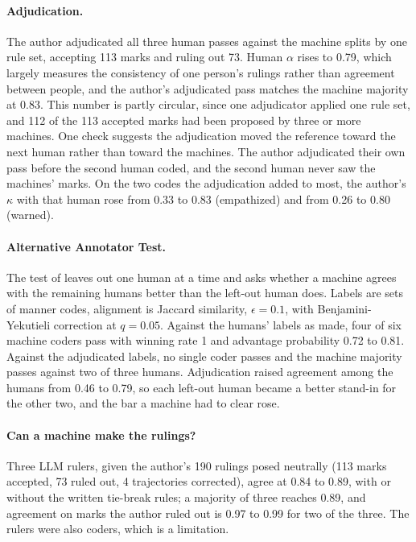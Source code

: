 \documentclass[11pt]{article}
\begin{document}
\paragraph{Adjudication.} The author adjudicated all three human passes against the machine splits
by one rule set, accepting 113 marks and ruling out 73. Human $\alpha$ rises to 0.79, which largely
measures the consistency of one person's rulings rather than agreement between people, and the author's
adjudicated pass matches the machine majority at 0.83. This number is partly circular, since one
adjudicator applied one rule set, and 112 of the 113 accepted marks had been proposed by three or
more machines. One check suggests the adjudication moved the reference toward the next human rather
than toward the machines. The author adjudicated their own pass before the second human coded, and
the second human never saw the machines' marks. On the two codes the
adjudication added to most, the author's $\kappa$ with that human rose from 0.33 to 0.83
(empathized) and from 0.26 to 0.80 (warned).

\paragraph{Alternative Annotator Test.} The test of \citet{calderon2025alttest} leaves out one
human at a time and asks whether a machine agrees with the remaining humans better than the
left-out human does. Labels are sets of manner codes, alignment is Jaccard similarity,
$\epsilon=0.1$, with Benjamini-Yekutieli correction at $q=0.05$. Against the humans' labels as made,
four of six machine coders pass with winning rate 1 and advantage probability 0.72 to 0.81. Against the
adjudicated labels, no single coder passes and the machine majority passes against two of three
humans. Adjudication raised agreement among the humans from 0.46 to 0.79, so each left-out human
became a better stand-in for the other two, and the bar a machine had to clear rose.

\paragraph{Can a machine make the rulings?} Three LLM rulers, given the author's 190 rulings posed
neutrally (113 marks accepted, 73 ruled out, 4 trajectories corrected), agree at 0.84 to 0.89, with or without the written tie-break rules; a
majority of three reaches 0.89, and agreement on marks the author ruled out is 0.97 to 0.99 for two
of the three. The rulers were also coders, which is a limitation.
\end{document}

